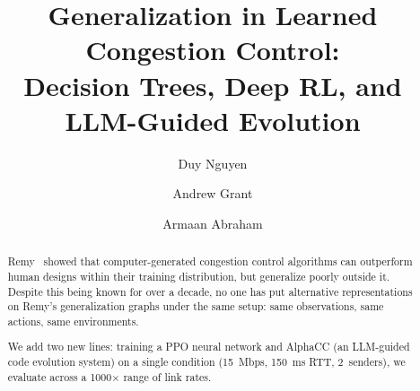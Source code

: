 \documentclass[sigconf,10pt]{acmart}
\begin{document}
\title[Generalization in Learned Congestion Control]{Generalization in Learned Congestion Control:\\Decision Trees, Deep RL, and LLM-Guided Evolution}

\author{Duy Nguyen}

\author{Andrew Grant}

\author{Armaan Abraham}

\renewcommand{\shortauthors}{Nguyen, Grant, Abraham}

\begin{abstract}
Remy~\cite{winstein2013tcp} showed that computer-generated congestion control
algorithms can outperform human designs within their training distribution, but
generalize poorly outside it. Despite this being known for over a decade, no
one has put alternative representations on Remy's generalization graphs under
the same setup: same observations, same actions, same environments.

We add two new lines: training a PPO neural network and AlphaCC (an
LLM-guided code evolution system) on a single condition (15~Mbps, 150~ms RTT,
2~senders), we evaluate across a 1000$\times$ range of link rates.

\end{abstract}

\maketitle



\balance


\end{document}
